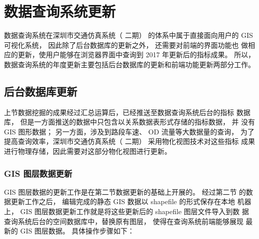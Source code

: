 

\chapter{数据查询系统更新}
数据查询系统在深圳市交通仿真系统（ 二期） 的体系中属于直接面向用户的
GIS 可视化系统， 因此除了后台数据库的更新之外， 还需要对前端的界面功能也
做相应的更新，使用户能够在浏览器界面中查询到 2017 年更新后的指标成果。
所以， 数据查询系统的年度更新主要包括后台数据库的更新和前端功能更新两部分工作。

\section{后台数据库更新}
上节数据挖掘的成果经过汇总运算后，已经推送至数据查询系统后台的指标
数据库， 但是一方面推送的数据中只包含以关系数据表形式存储的指标数据， 并
没有 GIS 图形数据； 另一方面，涉及到路段车速、 OD 流量等大数据量的查询，
为了提高查询效率，深圳市交通仿真系统（ 二期） 采用物化视图技术对这些指标
成果进行物理存储，因此需要对这部分物化视图进行更新。

\subsection{GIS 图层数据更新} \label{subsec:GIS 图层数据更新}
GIS 图层数据的更新工作是在第二节数据更新的基础上开展的。 经过第二节
的数据更新工作之后， 编辑完成的静态 GIS 数据以 shapefile 的形式保存在本地
机器上， GIS 图层数据更新工作就是将这些更新后的 shapefile 图层文件导入到数
据查询系统后台的空间数据库中，替换原有图层， 使得在查询系统前端能够展现
最新的 GIS 图层数据。 具体操作步骤如下：

